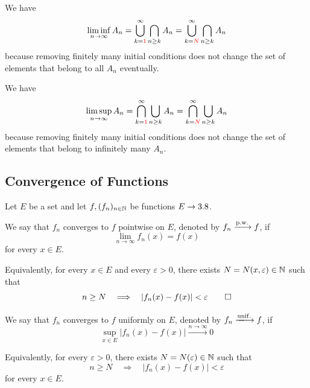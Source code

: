 \begin{minipage}[t]{0.48\textwidth}
We have
\[
\liminf_{n\to\infty} A_n
=
\bigcup_{k=\textcolor{red}{1}}^{\infty}\bigcap_{n\ge k} A_n
=
\bigcup_{k=\textcolor{red}{N}}^{\infty}\bigcap_{n\ge k} A_n
\]
because removing finitely many initial conditions does not change the set of elements that belong to all $A_n$ eventually.
\end{minipage}
\hfill
\begin{minipage}[t]{0.48\textwidth}
We have
\[
\limsup_{n\to\infty} A_n
=
\bigcap_{k=\textcolor{red}{1}}^{\infty}\bigcup_{n\ge k} A_n
=
\bigcap_{k=\textcolor{red}{N}}^{\infty}\bigcup_{n\ge k} A_n
\]
because removing finitely many initial conditions does not change the set of elements that belong to infinitely many $A_n$.
\end{minipage}


\subsection*{Convergence of Functions}

Let \(E\) be a set and let \(f,(f_n)_{n\in\mathbb{N}}\) be functions \(E\to3.8\).

\begin{definition}\label{def:function-pointwise-convergence}
We say that \(f_n\) converges to \(f\) pointwise on \(E\), denoted by
\(
f_n \xlongrightarrow{\mathrm{p.w.}} f
\),
if
\[
\lim_{n\to\infty} f_n(x)=f(x)
\]
for every \(x\in E\).

Equivalently, for every \(x\in E\) and every \(\varepsilon>0\), there exists \(N=N(x,\varepsilon)\in\mathbb{N}\) such that
\[
n\geq N
\quad\Longrightarrow\quad
|f_n(x)-f(x)|<\varepsilon
\qedhere
\]
\end{definition}

\begin{definition}\label{def:function-uniform-convergence}
We say that \(f_n\) converges to \(f\) uniformly on \(E\), denoted by
\(
f_n \xlongrightarrow{\mathrm{unif.}} f
\),
if
\[
\sup_{x\in E}|f_n(x)-f(x)|
\xrightarrow{n\to\infty}
0
\]

Equivalently, for every \(\varepsilon>0\), there exists \(N=N(\varepsilon)\in\mathbb{N}\) such that
\[
n\geq N
\quad\Longrightarrow\quad
|f_n(x)-f(x)|<\varepsilon
\]
for every \(x\in E\).
\end{definition}

